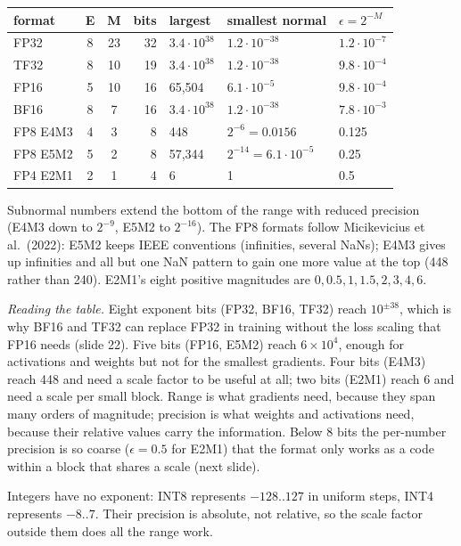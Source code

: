 \documentclass[11pt,letterpaper]{article}
\begin{document}
\begin{center}\small
\begin{tabular}{@{}lccrlll@{}}
\toprule
format & E & M & bits & largest & smallest normal & $\epsilon=2^{-M}$\\
\midrule
FP32 & 8 & 23 & 32 & $3.4\cdot10^{38}$ & $1.2\cdot10^{-38}$ & $1.2\cdot10^{-7}$\\
TF32 & 8 & 10 & 19 & $3.4\cdot10^{38}$ & $1.2\cdot10^{-38}$ & $9.8\cdot10^{-4}$\\
FP16 & 5 & 10 & 16 & 65,504 & $6.1\cdot10^{-5}$ & $9.8\cdot10^{-4}$\\
BF16 & 8 & 7 & 16 & $3.4\cdot10^{38}$ & $1.2\cdot10^{-38}$ & $7.8\cdot10^{-3}$\\
FP8 E4M3 & 4 & 3 & 8 & 448 & $2^{-6}=0.0156$ & 0.125\\
FP8 E5M2 & 5 & 2 & 8 & 57,344 & $2^{-14}=6.1\cdot10^{-5}$ & 0.25\\
FP4 E2M1 & 2 & 1 & 4 & 6 & 1 & 0.5\\
\bottomrule
\end{tabular}
\end{center}
Subnormal numbers extend the bottom of the range with reduced precision (E4M3 down to $2^{-9}$, E5M2 to $2^{-16}$). The FP8 formats follow Micikevicius et al.\ (2022): E5M2 keeps IEEE conventions (infinities, several NaNs); E4M3 gives up infinities and all but one NaN pattern to gain one more value at the top (448 rather than 240). E2M1's eight positive magnitudes are $0, 0.5, 1, 1.5, 2, 3, 4, 6$.

\emph{Reading the table.} Eight exponent bits (FP32, BF16, TF32) reach $10^{\pm38}$, which is why BF16 and TF32 can replace FP32 in training without the loss scaling that FP16 needs (slide 22). Five bits (FP16, E5M2) reach $6\times10^4$, enough for activations and weights but not for the smallest gradients. Four bits (E4M3) reach 448 and need a scale factor to be useful at all; two bits (E2M1) reach 6 and need a scale per small block. Range is what gradients need, because they span many orders of magnitude; precision is what weights and activations need, because their relative values carry the information. Below 8 bits the per-number precision is so coarse ($\epsilon=0.5$ for E2M1) that the format only works as a code within a block that shares a scale (next slide).

Integers have no exponent: INT8 represents $-128..127$ in uniform steps, INT4 represents $-8..7$. Their precision is absolute, not relative, so the scale factor outside them does all the range work.
\end{document}
